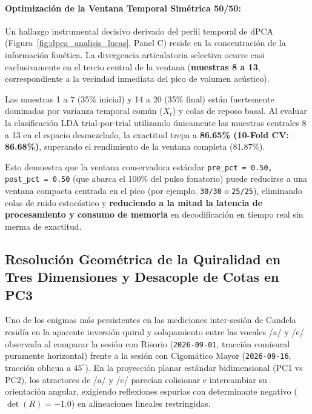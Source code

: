 \documentclass[11pt,a4paper,openany]{book}
\theoremstyle{definition}
\begin{document}
\paragraph{Optimización de la Ventana Temporal Simétrica 50/50:}
Un hallazgo instrumental decisivo derivado del perfil temporal de dPCA (Figura~\ref{fig:dpca_analisis_lucas}, Panel C) reside en la concentración de la información fonética. La divergencia articulatoria selectiva ocurre casi exclusivamente en el tercio central de la ventana (\textbf{muestras 8 a 13}, correspondiente a la vecindad inmediata del pico de volumen acústico).

Las muestras 1 a 7 (35\% inicial) y 14 a 20 (35\% final) están fuertemente dominadas por varianza temporal común ($X_t$) y colas de reposo basal. Al evaluar la clasificación LDA trial-por-trial utilizando únicamente las muestras centrales 8 a 13 en el espacio desmezclado, la exactitud trepa a \textbf{86.65\% (10-Fold CV: 86.68\%)}, superando el rendimiento de la ventana completa (81.87\%).

Esto demuestra que la ventana conservadora estándar \texttt{pre\_pct = 0.50, post\_pct = 0.50} (que abarca el 100\% del pulso fonatorio) puede reducirse a una ventana compacta centrada en el pico (por ejemplo, \texttt{30/30} o \texttt{25/25}), eliminando colas de ruido estocástico y \textbf{reduciendo a la mitad la latencia de procesamiento y consumo de memoria} en decodificación en tiempo real sin merma de exactitud.

\subsection{Resolución Geométrica de la Quiralidad en Tres Dimensiones y Desacople de Cotas en PC3}
\label{subsec:resolucion_quiralidad_3d}

Uno de los enigmas más persistentes en las mediciones inter-sesión de Candela residía en la aparente inversión quiral y solapamiento entre las vocales /a/ y /e/ observada al comparar la sesión con Risorio (\texttt{2026-09-01}, tracción comisural puramente horizontal) frente a la sesión con Cigomático Mayor (\texttt{2026-09-16}, tracción oblicua a $45^\circ$). En la proyección planar estándar bidimensional (PC1 vs PC2), los atractores de /a/ y /e/ parecían colisionar e intercambiar su orientación angular, exigiendo reflexiones espurias con determinante negativo ($\det(R) = -1.0$) en alineaciones lineales restringidas.
\end{document}
